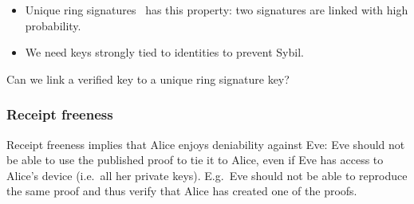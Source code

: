 
\begin{frame}
  \begin{remark}
    \begin{itemize}
      \item Unique ring signatures~\cite{UniqueRingSignatures} has this 
        property: two signatures are linked with high probability.
      \item We need keys strongly tied to identities to prevent Sybil.
    \end{itemize}
  \end{remark}

  \begin{question}
    Can we link a verified key to a unique ring signature key?
  \end{question}
\end{frame}

\subsubsection{Receipt freeness}

Receipt freeness implies that Alice enjoys deniability against Eve:
Eve should not be able to use the published proof to tie it to Alice, even if 
Eve has access to Alice's device (i.e.\ all her private keys).
E.g.\ Eve should not be able to reproduce the same proof and thus verify that 
Alice has created one of the proofs.


